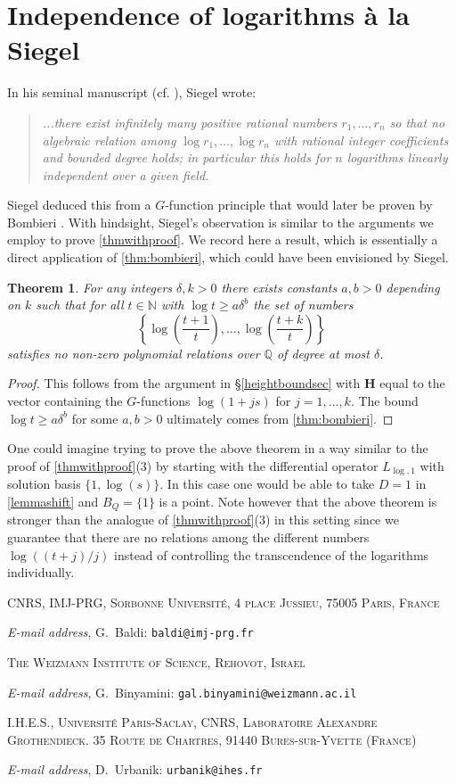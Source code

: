 \documentclass[10pt]{article}
\makeatletter
\numberwithin{equation}{section}
\theoremstyle{plain}
\newtheorem*{thm*}{Theorem}
\theoremstyle{definition}
\theoremstyle{remark}
\newcommand{\Addresses}{{%
  \bigskip
  \footnotesize

\textsc{CNRS, IMJ-PRG, Sorbonne Universit\'{e}, 4 place Jussieu, 75005 Paris, France}\par\nopagebreak
  \textit{E-mail address}, G.~Baldi: \texttt{baldi@imj-prg.fr} 

  \medskip
  
  
 \textsc{The Weizmann Institute of Science, Rehovot, Israel}\par\nopagebreak
  \textit{E-mail address}, G.~Binyamini: \texttt{gal.binyamini@weizmann.ac.il} 

  \medskip 
  
\textsc{I.H.E.S., Universit\'e Paris-Saclay, CNRS, Laboratoire Alexandre Grothendieck. 35 Route de Chartres, 91440 Bures-sur-Yvette (France)}\par\nopagebreak
  \textit{E-mail address}, D.~Urbanik: \texttt{urbanik@ihes.fr}
}}
\makeatother
\begin{document}
\setcounter{savedsection}{\value{section}}


\appendix
\renewcommand{\thesection}{A}
\section{Independence of logarithms \`a la Siegel}\label{app}
\renewcommand{\thesection}{\arabic{section}}


In his seminal manuscript \cite{zbMATH02563202} (cf. \cite[\S1.4 VIII]{zbMATH06385898}), Siegel wrote:

\begin{quote}
\emph{...there exist infinitely many positive rational numbers $r_1, \hdots , r_n$ so that no algebraic relation among $\log r_1, \hdots, \log r_n$ with rational integer coefficients and bounded degree holds; in particular this holds for $n$ logarithms linearly independent over a given field.}
\end{quote}
\noindent Siegel deduced this from a $G$-function principle that would later be proven by Bombieri \cite{zbMATH03721021}. With hindsight, Siegel's observation is similar to the arguments we employ to prove \autoref{thmwithproof}. We record here a result, which is essentially a direct application of \autoref{thm:bombieri}, which could have been envisioned by Siegel.

\begin{thm*}
\label{logthm}
For any integers $\delta, k > 0$ there exists constants $a, b > 0$ depending on $k$ such that for all $t \in \mathbb{N}$ with $\log t \geq a \delta^{b}$ the set of numbers
\[ \left\{ \log\left( \frac{t+1}{t} \right), \hdots, \log\left( \frac{t+k}{t} \right) \right\} \]
satisfies no non-zero polynomial relations over $\mathbb{Q}$ of degree at most $\delta$.
\end{thm*}

\begin{proof}
This follows from the argument in \S\ref{heightboundsec} with $\mathbf{H}$ equal to the vector containing the $G$-functions $\log(1 + js)$ for $j = 1, \hdots, k$. The bound $\log t \geq a \delta^{b}$ for some $a, b > 0$ ultimately comes from \autoref{thm:bombieri}.
\end{proof}

One could imagine trying to prove the above theorem in a way similar to the proof of \autoref{thmwithproof}(3) by starting with the differential operator $L_{\operatorname{log},1}$ with solution basis $\{ 1, \log(s) \}$. In this case one would be able to take $D = 1$ in \autoref{lemmashift} and $B_{Q} = \{ 1 \}$ is a point. Note however that the above theorem is stronger than the analogue of \autoref{thmwithproof}(3) in this setting since we guarantee that there are no relations among the different numbers $\log((t + j)/j)$ instead of controlling the transcendence of the logarithms individually.



\setcounter{section}{\value{savedsection}}
\renewcommand{\thesection}{\arabic{section}}







\Addresses
\end{document}
